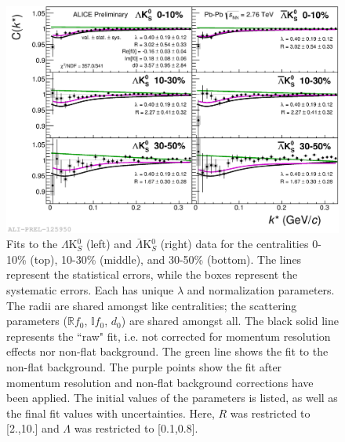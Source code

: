 \documentclass[../AnalysisNoteJBuxton.tex]{subfiles}
\begin{document}
\begin{figure}[h]
  \centering
  \includegraphics[width=\textwidth]{7_ResultsAndDiscussion/Figures/2017-Feb-03-canKStarCfwFitsLamK0wConj_0010_1030_3050_MomResCrctn_NonFlatBgdCrctn_SingleLamParam.png}
  \caption[$\Lambda$K$^{0}_{S}$($\bar{\Lambda}$K$^{0}_{S}$) Fits]{Fits to the $\Lambda$K$^{0}_{S}$ (left) and $\bar{\Lambda}$K$^{0}_{S}$ (right) data for the centralities 0-10\% (top), 10-30\% (middle), and 30-50\% (bottom).
The lines represent the statistical errors, while the boxes represent the systematic errors.
Each has unique $\lambda$ and normalization parameters.
The radii are shared amongst like centralities; the scattering parameters ($\mathbb{R}f_{0}$, $\mathbb{I}f_{0}$, $d_{0}$) are shared amongst all.
The black solid line represents the ``raw" fit, i.e. not corrected for momentum resolution effects nor non-flat background.  
The green line shows the fit to the non-flat background.
The purple points show the fit after momentum resolution and non-flat background corrections have been applied.
The initial values of the parameters is listed, as well as the final fit values with uncertainties.
Here, $R$ was restricted to [2.,10.] and $\Lambda$ was restricted to [0.1,0.8].}
  \label{fig:LamK0wConjFits}
\end{figure}
\end{document}
